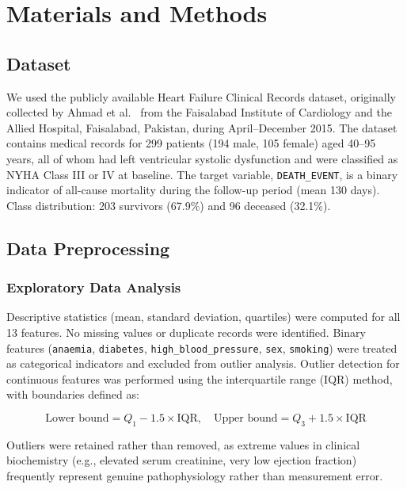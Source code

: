 \documentclass[12pt, a4paper]{article}
\begin{document}
\section{Materials and Methods}
\label{sec:methods}

\subsection{Dataset}

We used the publicly available Heart Failure Clinical Records dataset, 
originally collected by Ahmad et al.\ \cite{ahmad2017} from the 
Faisalabad Institute of Cardiology and the Allied Hospital, Faisalabad, 
Pakistan, during April–December 2015. The dataset contains medical records 
for 299 patients (194 male, 105 female) aged 40–95 years, all of whom had 
left ventricular systolic dysfunction and were classified as NYHA Class III 
or IV at baseline. The target variable, \texttt{DEATH\_EVENT}, is a binary 
indicator of all-cause mortality during the follow-up period 
(mean 130 days). Class distribution: 203 survivors (67.9\%) and 96 
deceased (32.1\%).

\subsection{Data Preprocessing}

\subsubsection{Exploratory Data Analysis}

Descriptive statistics (mean, standard deviation, quartiles) were computed 
for all 13 features. No missing values or duplicate records were identified. 
Binary features (\texttt{anaemia}, \texttt{diabetes}, 
\texttt{high\_blood\_pressure}, \texttt{sex}, \texttt{smoking}) were treated 
as categorical indicators and excluded from outlier analysis. Outlier 
detection for continuous features was performed using the interquartile range 
(IQR) method, with boundaries defined as:

\begin{equation}
    \text{Lower bound} = Q_1 - 1.5 \times \text{IQR}, \quad
    \text{Upper bound} = Q_3 + 1.5 \times \text{IQR}
    \label{eq:iqr}
\end{equation}

Outliers were retained rather than removed, as extreme values in clinical 
biochemistry (e.g., elevated serum creatinine, very low ejection fraction) 
frequently represent genuine pathophysiology rather than measurement error.
\end{document}
